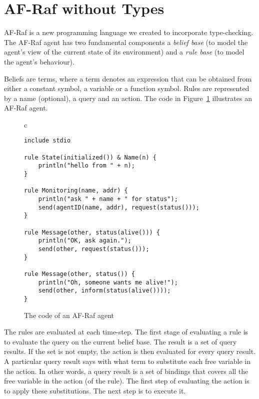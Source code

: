 \documentclass{aamas2012} %
\theoremstyle{remark}
\begin{document}
\section{AF-Raf without Types} \label{sec:af-raf} %

AF-Raf is a new programming language we created to incorporate
type-checking. The AF-Raf agent has two fundamental components a
\textit{belief base} (to model the agent's view of the current state of its
environment) and a \textit{rule base} (to model the agent's behaviour).

Beliefs are terms, where a term denotes an expression that can be obtained
from either a constant symbol, a variable or a function symbol. Rules are
represented by a name (optional), a query and an action.  The code in
Figure~\ref{fig:AF-Raf} illustrates an AF-Raf agent.


\begin{figure}\footnotesize %
\begin{center}
\begin{tabular}{c}
\begin{lstlisting}[style=hs]
include stdio

rule State(initialized()) & Name(n) {
    println("hello from " + n);
}

rule Monitoring(name, addr) {
    println("ask " + name + " for status");
    send(agentID(name, addr), request(status()));
}

rule Message(other, status(alive())) {
    println("OK, ask again.");
    send(other, request(status()));
}

rule Message(other, status()) {
    println("Oh, someone wants me alive!");
    send(other, inform(status(alive())));
}
\end{lstlisting}
\end{tabular}
\end{center}
\caption{The code of an AF-Raf agent}
\label{fig:AF-Raf}
\end{figure} %

The rules are evaluated at each time-step. The first stage of evaluating a
rule is to evaluate the query on the current belief base. The result is a
set of query results. If the set is not empty, the action is then evaluated
for every query result. A particular query result says with what term to
substitute each free variable in the action. In other words, a query result
is a set of bindings that covers all the free variable in the action (of
the rule). The first step of evaluating the action is to apply these
substitutions. The next step is to execute it.
\end{document}

